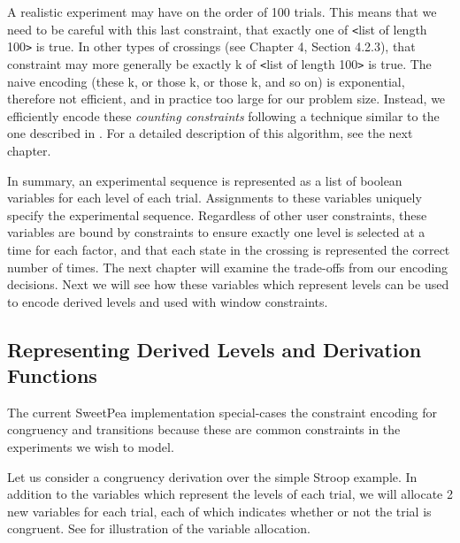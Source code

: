 A realistic experiment may have on the order of 100 trials. This means that we need to be careful with this last constraint, that exactly one of \texttt{<}list of length 100\texttt{>} is true. In other types of crossings (see Chapter 4, Section 4.2.3), that constraint may more generally be exactly k of \texttt{<}list of length 100\texttt{>} is true. The naive encoding (these k, or those k, or those k, and so on) is exponential, therefore not efficient, and in practice too large for our problem size. Instead, we efficiently encode these \emph{counting constraints} following a technique similar to the one described in \cite{sinz2005towards}. For a detailed description of this algorithm, see the next chapter.

In summary, an experimental sequence is represented as a list of boolean variables for each level of each trial. Assignments to these variables uniquely specify the experimental sequence. Regardless of other user constraints, these variables are bound by constraints to ensure exactly one level is selected at a time for each factor, and that each state in the crossing is represented the correct number of times. The next chapter will examine the trade-offs from our encoding decisions. Next we will see how these variables which represent levels can be used to encode derived levels and used with window constraints.

\subsection{Representing Derived Levels and Derivation Functions}

The current SweetPea implementation special-cases the constraint encoding for congruency and transitions because these are common constraints in the experiments we wish to model.

Let us consider a congruency derivation over the simple Stroop example. In addition to the variables which represent the levels of each trial, we will allocate 2 new variables for each trial, each of which indicates whether or not the trial is congruent. See  for illustration of the variable allocation.






